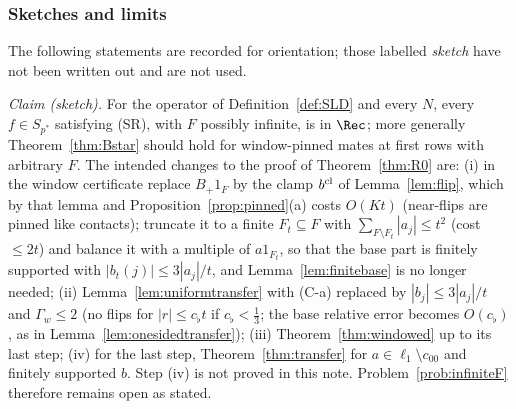 
\subsubsection*{Sketches and limits}
The following statements are recorded for orientation; those labelled
\emph{sketch} have not been written out and are not used.

\begin{remark}\label{rem:Binf}
\emph{Claim (sketch).}  For the operator of Definition~\ref{def:SLD} and
every $N$, every $f\in S_{p^*}$ satisfying \textup{(SR)}, with $F$ possibly
infinite, is in $\Rec$; more generally Theorem~\ref{thm:Bstar} should hold
for window-pinned mates at first rows with arbitrary $F$.  The intended
changes to the proof of Theorem~\ref{thm:R0} are: (i) in the window
certificate replace $B_+1_F$ by the clamp $b^{\rm cl}$ of
Lemma~\ref{lem:flip}, which by that lemma and
Proposition~\ref{prop:pinned}(a) costs $O(Kt)$ (near-flips are pinned like
contacts); truncate it to a finite $F_t\subseteq F$ with $\sum_{F\setminus
F_t}|a_j|\le t^2$ (cost $\le2t$) and balance it with a multiple of
$a1_{F_t}$, so that the base part is finitely supported with
$|b_t(j)|\le3|a_j|/t$, and Lemma~\ref{lem:finitebase} is no longer needed;
(ii) Lemma~\ref{lem:uniformtransfer} with (C-a) replaced by
$|b_j|\le3|a_j|/t$ and $\Gamma_w\le2$ (no flips for $|r|\le c_\flat t$ if
$c_\flat<\frac13$; the base relative error becomes $O(c_\flat)$, as in
Lemma~\ref{lem:onesidedtransfer}); (iii) Theorem~\ref{thm:windowed} up to
its last step; (iv) for the last step, Theorem~\ref{thm:transfer} for
$a\in\ell_1\setminus c_{00}$ and finitely supported $b$.  Step (iv) is not
proved in this note.  Problem~\ref{prob:infiniteF} therefore remains open
as stated.
\end{remark}

